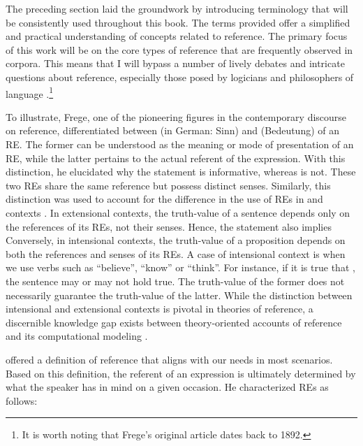 The preceding section laid the groundwork by introducing terminology that will be consistently used throughout this book.  The terms provided offer a simplified and practical understanding of concepts related to reference. The primary focus of this work will be on the core types of reference that are frequently observed in corpora. This means that I will bypass a number of lively debates and intricate questions about reference, especially those posed by logicians and philosophers of language \citep{frege1960,russell1905denoting,strawson1950referring,donnellan1966reference,searle1969speech,Recanati1993}.\footnote{It is worth noting that Frege's original article dates back to 1892.}

To illustrate, Frege, one of the pioneering figures in the contemporary discourse on reference, differentiated between  (in German: Sinn) and  (Bedeutung) of an RE. The former can be understood as the meaning or mode of presentation of an RE, while the latter pertains to the actual referent of the expression. With this distinction, he elucidated why the statement  is informative, whereas  is not.
These two REs share the same reference but possess distinct senses. Similarly, this distinction was used to account for the difference in the use of REs in  and  contexts \citep{van2016computational}. In extensional contexts, the truth-value of a sentence depends only on the references of its REs, not their senses. Hence, the statement  also implies  Conversely, in intensional contexts, the truth-value of a proposition depends on both the references and senses of its REs. A case of intensional context is when we use verbs such as ``believe'', ``know'' or ``think''. For instance, if it is true that , the sentence  may or may not hold true. The truth-value of the former does not necessarily guarantee the truth-value of the latter. While the distinction between intensional and extensional contexts is pivotal in theories of reference, a discernible knowledge gap exists between theory-oriented accounts of reference and its computational modeling \citep{van2016computational}.

\citet{searle1969speech} offered a definition of reference that aligns with our needs in most scenarios. Based on this definition, the referent of an expression is ultimately determined by what the speaker has in mind on a given occasion. He characterized REs as follows:

